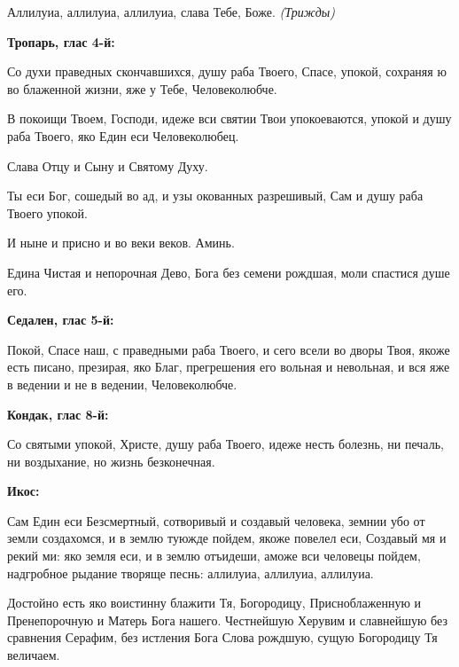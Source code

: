    Аллилуиа, аллилуиа, аллилуиа, слава Тебе, Боже. \itshape (Трижды)\normalfont{}



 

\bfseries Тропарь, глас 4-й:\normalfont{}


   Со духи праведных скончавшихся, душу раба Твоего, Спасе, упокой,
сохраняя ю во блаженной жизни, яже у Тебе, Человеколюбче.



   В покоищи Твоем, Господи, идеже вси святии Твои упокоеваются, упокой
и душу раба Твоего, яко Един еси Человеколюбец.



   Слава Отцу и Сыну и Святому Духу.



   Ты еси Бог, сошедый во ад, и узы окованных разрешивый, Сам и душу
раба Твоего упокой.



   И ныне и присно и во веки веков. Аминь.



   Едина Чистая и непорочная Дево, Бога без семени рождшая, моли
спастися душе его.



 

\bfseries Седален, глас 5-й:\normalfont{}


   Покой, Спасе наш, с праведными раба Твоего, и сего всели во дворы
Твоя, якоже есть писано, презирая, яко Благ, прегрешения его вольная и
невольная, и вся яже в ведении и не в ведении, Человеколюбче.




 

\bfseries Кондак, глас 8-й:\normalfont{}


   Со святыми упокой, Христе, душу раба Твоего, идеже несть болезнь, ни
печаль, ни воздыхание, но жизнь безконечная.



 

\bfseries Икос:\normalfont{}


   Сам Един еси Безсмертный, сотворивый и создавый человека, земнии убо
от земли создахомся, и в землю туюжде пойдем, якоже повелел еси,
Создавый мя и рекий ми: яко земля еси, и в землю отъидеши, аможе вси
человецы пойдем, надгробное рыдание творяще песнь: аллилуиа, аллилуиа,
аллилуиа.



   Достойно есть яко воистинну блажити Тя, Богородицу, Присноблаженную и
Пренепорочную и Матерь Бога нашего. Честнейшую Херувим и славнейшую
без сравнения Серафим, без истления Бога Слова рождшую, сущую
Богородицу Тя величаем.



